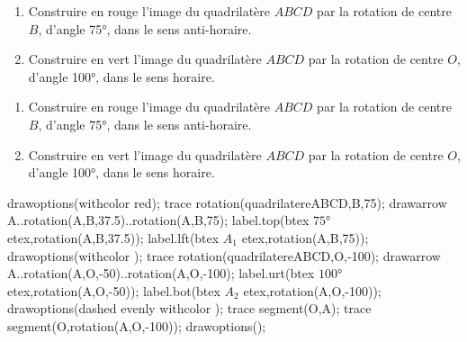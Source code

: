 \begin{exercice*}
    \begin{enumerate}
        \item Construire en rouge l'image du quadrilatère $ABCD$ par la rotation de centre $B$, d'angle \ang{75}, dans le sens anti-horaire.
        \item Construire en vert l'image du quadrilatère $ABCD$ par la rotation de centre $O$, d'angle \ang{100}, dans le sens horaire.
    \end{enumerate}
    \hspace*{-10mm}
    \begin{Geometrie}[CoinHD={(9u,7u)}]        
        \enonceTroisiemeGTroisExoOnze
    \end{Geometrie}
\end{exercice*}
\begin{corrige}
    \begin{enumerate}
        \item Construire en rouge l'image du quadrilatère $ABCD$ par la rotation de centre $B$, d'angle \ang{75}, dans le sens anti-horaire.
        \item Construire en vert l'image du quadrilatère $ABCD$ par la rotation de centre $O$, d'angle \ang{100}, dans le sens horaire.
    \end{enumerate}

    \begin{Geometrie}[CoinHD={(9u,7u)}]        
        \enonceTroisiemeGTroisExoOnze
        drawoptions(withcolor red);
        trace rotation(quadrilatereABCD,B,75);
        drawarrow A..rotation(A,B,37.5)..rotation(A,B,75);
        label.top(btex $\ang{75}$ etex,rotation(A,B,37.5));
        label.lft(btex $A_1$ etex,rotation(A,B,75));
        drawoptions(withcolor \myMetapostGreen);
        trace rotation(quadrilatereABCD,O,-100);         
        drawarrow A..rotation(A,O,-50)..rotation(A,O,-100);         
        label.urt(btex $\ang{100}$ etex,rotation(A,O,-50));
        label.bot(btex $A_2$ etex,rotation(A,O,-100));
        drawoptions(dashed evenly withcolor \myMetapostGreen);
        trace segment(O,A);
        trace segment(O,rotation(A,O,-100));
        drawoptions(); 
    \end{Geometrie}
\end{corrige}

